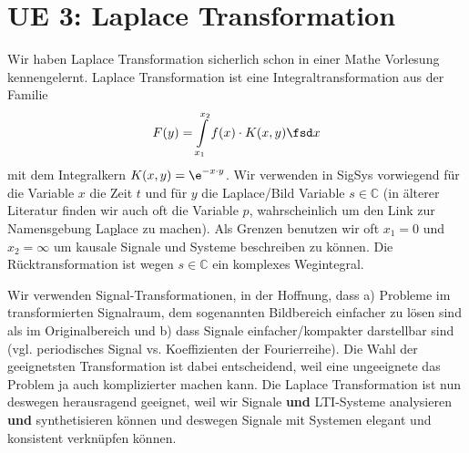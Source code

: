 \clearpage
\section{UE 3: Laplace Transformation}
\label{sec:ue3_laplace}
%
Wir haben Laplace Transformation sicherlich schon in einer Mathe Vorlesung
kennengelernt.
Laplace Transformation ist eine Integraltransformation aus der Familie
\begin{equation}
F(y) = \int\limits_{x_1}^{x_2} f(x) \cdot K(x,y) \fsd x
\end{equation}
mit dem Integralkern $K(x,y) = \e^{-x \cdot y}$.
Wir verwenden in SigSys vorwiegend für die Variable $x$ die Zeit $t$ und für
$y$ die Laplace/Bild Variable $s\in\mathbb{C}$ (in älterer Literatur finden
wir auch oft die Variable $p$, wahrscheinlich um den Link zur Namensgebung
La\underline{p}lace zu machen).
Als Grenzen benutzen wir oft $x_1=0$ und $x_2=\infty$ um kausale Signale und
Systeme beschreiben zu können.
%
Die Rücktransformation ist wegen $s\in\mathbb{C}$ ein komplexes Wegintegral.

Wir verwenden Signal-Transformationen, in der Hoffnung, dass a) Probleme im
transformierten Signalraum, dem sogenannten Bildbereich einfacher zu lösen
sind als im Originalbereich und b) dass Signale einfacher/kompakter darstellbar
sind (vgl. periodisches Signal vs. Koeffizienten der Fourierreihe).
%
Die Wahl der geeignetsten Transformation ist dabei entscheidend, weil eine
ungeeignete das Problem ja auch komplizierter machen kann.
%
Die Laplace Transformation ist nun deswegen herausragend geeignet, weil
wir Signale \textbf{und} LTI-Systeme analysieren \textbf{und} synthetisieren
können und deswegen Signale mit Systemen elegant und konsistent verknüpfen können.

